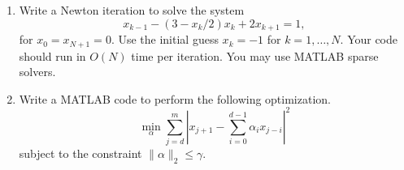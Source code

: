 \documentclass[12pt, leqno]{article}
\begin{document}
\begin{enumerate}
\item
  Write a Newton iteration to solve the system
  \[
    x_{k-1} - (3-x_k/2) x_k + 2 x_{k+1} = 1,
  \]
  for $x_0 = x_{N+1} = 0$.  Use the initial guess
  $x_k = -1$ for $k=1, \ldots, N$.
  Your code should run in $O(N)$ time per iteration.
  You may use MATLAB sparse solvers.

\item
  Write a MATLAB code to perform the following optimization.
  \[
    \min_{\alpha} \sum_{j=d}^m \left|x_{j+1}-\sum_{i=0}^{d-1} \alpha_i x_{j-i}\right|^2
  \]
  subject to the constraint $\|\alpha\|_2 \leq \gamma$.

\end{enumerate}
\end{document}
